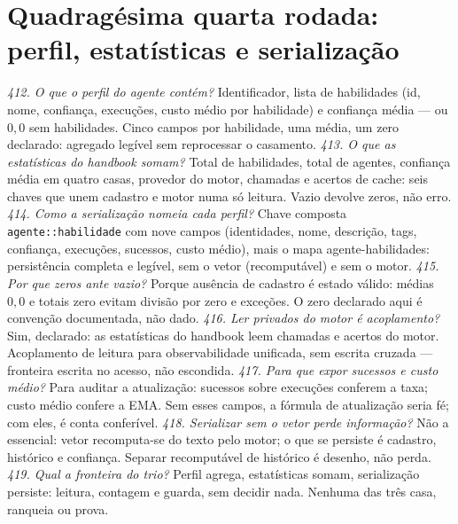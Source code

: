 \section{Quadragésima quarta rodada: perfil, estatísticas e serialização}
\textit{412. O que o perfil do agente contém?} Identificador, lista de habilidades (id, nome, confiança, execuções, custo médio por habilidade) e confiança média --- ou $0{,}0$ sem habilidades. Cinco campos por habilidade, uma média, um zero declarado: agregado legível sem reprocessar o casamento.
\textit{413. O que as estatísticas do handbook somam?} Total de habilidades, total de agentes, confiança média em quatro casas, provedor do motor, chamadas e acertos de cache: seis chaves que unem cadastro e motor numa só leitura. Vazio devolve zeros, não erro.
\textit{414. Como a serialização nomeia cada perfil?} Chave composta \texttt{agente::habilidade} com nove campos (identidades, nome, descrição, tags, confiança, execuções, sucessos, custo médio), mais o mapa agente-habilidades: persistência completa e legível, sem o vetor (recomputável) e sem o motor.
\textit{415. Por que zeros ante vazio?} Porque ausência de cadastro é estado válido: médias $0{,}0$ e totais zero evitam divisão por zero e exceções. O zero declarado aqui é convenção documentada, não dado.
\textit{416. Ler privados do motor é acoplamento?} Sim, declarado: as estatísticas do handbook leem chamadas e acertos do motor. Acoplamento de leitura para observabilidade unificada, sem escrita cruzada --- fronteira escrita no acesso, não escondida.
\textit{417. Para que expor sucessos e custo médio?} Para auditar a atualização: sucessos sobre execuções conferem a taxa; custo médio confere a EMA. Sem esses campos, a fórmula de atualização seria fé; com eles, é conta conferível.
\textit{418. Serializar sem o vetor perde informação?} Não a essencial: vetor recomputa-se do texto pelo motor; o que se persiste é cadastro, histórico e confiança. Separar recomputável de histórico é desenho, não perda.
\textit{419. Qual a fronteira do trio?} Perfil agrega, estatísticas somam, serialização persiste: leitura, contagem e guarda, sem decidir nada. Nenhuma das três casa, ranqueia ou prova.

